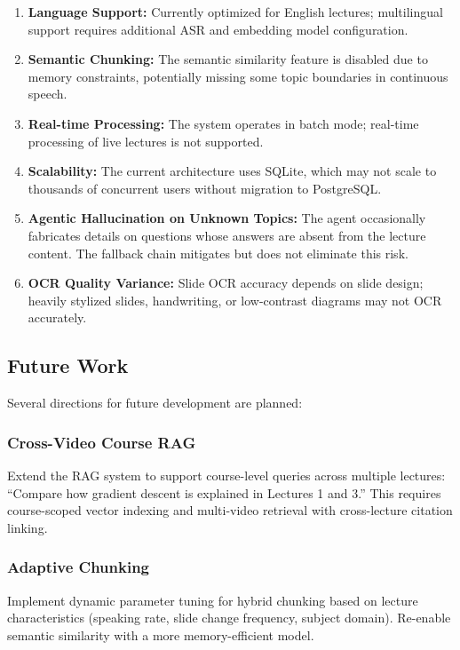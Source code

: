 \begin{enumerate}
    \item \textbf{Language Support:} Currently optimized for English lectures; multilingual support requires additional ASR and embedding model configuration.
    \item \textbf{Semantic Chunking:} The semantic similarity feature is disabled due to memory constraints, potentially missing some topic boundaries in continuous speech.
    \item \textbf{Real-time Processing:} The system operates in batch mode; real-time processing of live lectures is not supported.
    \item \textbf{Scalability:} The current architecture uses SQLite, which may not scale to thousands of concurrent users without migration to PostgreSQL.
    \item \textbf{Agentic Hallucination on Unknown Topics:} The agent occasionally fabricates details on questions whose answers are absent from the lecture content. The fallback chain mitigates but does not eliminate this risk.
    \item \textbf{OCR Quality Variance:} Slide OCR accuracy depends on slide design; heavily stylized slides, handwriting, or low-contrast diagrams may not OCR accurately.
\end{enumerate}

\subsection{Future Work}

Several directions for future development are planned:

\subsubsection{Cross-Video Course RAG}

Extend the RAG system to support course-level queries across multiple lectures: ``Compare how gradient descent is explained in Lectures 1 and 3.'' This requires course-scoped vector indexing and multi-video retrieval with cross-lecture citation linking.

\subsubsection{Adaptive Chunking}

Implement dynamic parameter tuning for hybrid chunking based on lecture characteristics (speaking rate, slide change frequency, subject domain). Re-enable semantic similarity with a more memory-efficient model.

